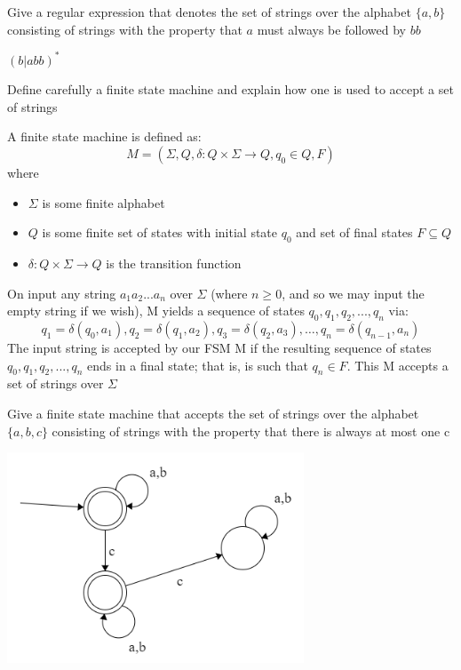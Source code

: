 \documentclass{exam}
\begin{document}
\begin{questions}
\question[7]Give a regular expression that denotes the set of strings over the alphabet $\{a,b\}$ consisting of strings with the property that $a$ must always be followed by $bb$
\begin{solution}[2in]
	$(b|abb)^*$
\end{solution}

\question[8]Define carefully a finite state machine and explain how one is used to accept a set of strings
\begin{solution}[2in]
	A finite state machine is defined as:
	\[
	M=\left(\Sigma, Q, \delta : Q \times \Sigma \rightarrow Q, q_{0} \in Q, F\right)
	\]
	where
	\begin{itemize}
		\item $\Sigma$ is some finite alphabet
		\item $Q$ is some finite set of states with initial state $q_0$ and set of final states $F\subseteq Q$
		\item $\delta: Q\times \Sigma \rightarrow Q$ is the transition function
	\end{itemize}
On input any string $a_1a_2...a_n$ over $\Sigma$ (where $n \geq 0$, and so we may input the empty string if we wish), M yields a sequence of states $q_0,q_1,q_2,...,q_n$ via:
\[
q_{1}=\delta\left(q_{0}, a_{1}\right), q_{2}=\delta\left(q_{1}, a_{2}\right), q_{3}=\delta\left(q_{2}, a_{3}\right), \ldots, q_{n}=\delta\left(q_{n-1}, a_{n}\right)
\]
The input string is accepted by our FSM M if the resulting sequence of states $q_0,q_1,q_2,...,q_n$ ends in a final state; that is, is such that $q_n\in F$. This M accepts a set of strings over $\Sigma$
\end{solution}


\question[5]Give a finite state machine that accepts the set of strings over the alphabet $\{a,b,c\}$ consisting of strings with the property that there is always at most one c
\begin{solution}[2in]
	\begin{center}
		\includegraphics[scale=0.7]{Q18}
	\end{center}	
\end{solution}



\end{questions}
\end{document}
